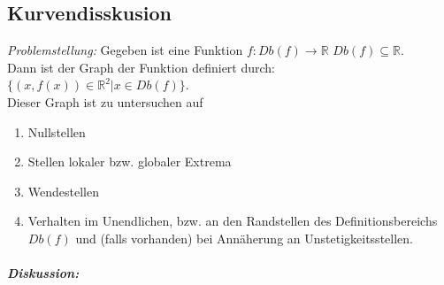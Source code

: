 \subsection{Kurvendisskusion}
\emph{Problemstellung:} Gegeben ist eine Funktion $f: Db(f) \to \mathbb{R}$ $Db(f) \subseteq \mathbb{R}$.\\
Dann ist der Graph der Funktion definiert durch: $\{ (x,f(x))\in \mathbb{R}^2| x \in Db(f)\}$.\\
Dieser Graph ist zu untersuchen auf 
\begin{enumerate}[label=\alph*.)]
\item Nullstellen
\item Stellen lokaler bzw. globaler Extrema
\item Wendestellen
\item Verhalten im Unendlichen, bzw. an den Randstellen des Definitionsbereichs $Db(f)$ und (falls vorhanden) bei Annäherung an Unstetigkeitsstellen.
\end{enumerate}
\subparagraph{Diskussion:} 
